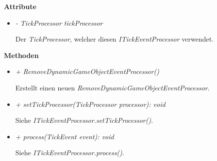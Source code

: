             \textbf{Attribute}
            \begin{itemize}
                \item  \textit{- TickProcessor tickProcessor}
                    \begin{leftbar}[0.9\linewidth]
                        Der \textit{TickProcessor}, welcher diesen \textit{ITickEventProcessor} verwendet.
                    \end{leftbar}
            \end{itemize}
            \textbf{Methoden}					
            \begin{itemize}
                \item  \textit{+ RemoveDynamicGameObjectEventProcessor()}
                    \begin{leftbar}[0.9\linewidth]
                        Erstellt einen neuen \textit{RemoveDynamicGameObjectEventProcessor}.
                    \end{leftbar}
                \item \textit{+ setTickProcessor(TickProcessor processor): void}
                    \begin{leftbar}[0.9\linewidth]
                        Siehe \textit{ITickEventProcessor.setTickProcessor()}.
                    \end{leftbar}
                \item  \textit{+ process(TickEvent event): void}
                    \begin{leftbar}[0.9\linewidth]
                        Siehe \textit{ITickEventProcessor.process()}.
                    \end{leftbar}
            \end{itemize}